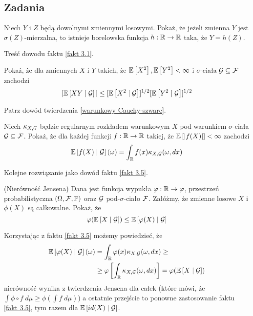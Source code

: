 \subsection{Zadania}

\setcounter{problem}{0}

\begin{problem}
  Niech $Y$ i $Z$ będą dowolnymi zmiennymi losowymi. Pokaż, że jeżeli zmienna $Y$ jest $\sigma(Z)$-mierzalna, to istnieje borelowska funkcja $h:\operatorname{\mathbb{R}}\to \operatorname{\mathbb{R}}$ taka, że $Y=h(Z)$.
\end{problem}

\begin{solution}
  Treść dowodu faktu \ref{fakt 3.1}.
\end{solution}

\begin{problem}
  Pokaż, że dla zmiennych $X$ i $Y$ takich, że $\expected{X^2},\expected{Y^2}<\infty$ i $\sigma$-ciała $\mathcal{G}\subseteq\mathcal{F}$ zachodzi
  $$|\expected{XY}{\set{G}}|\leq[\expected{X^2}{\set{G}}]^{1/2}[\expected{Y^2}{\set{G}}]^{1/2}$$
\end{problem}

\begin{solution}
  Patrz dowód twierdzenia \ref{warunkowy Cauchy-szwarc}.
\end{solution}

\begin{problem}
  Niech $\kappa_{X,\mathcal{G}}$ będzie regularnym rozkładem warunkowym $X$ pod warunkiem $\sigma$-ciała $\mathcal{G}\subseteq\mathcal{F}$. Pokaż, że dla każdej funkcji $f:\operatorname{\mathbb{R}}\to\operatorname{\mathbb{R}}$ takiej, że $\expected{|f(X)|}<\infty$ zachodzi
  $$\expected{f(X)}{\set{G}}(\omega)=\int_{\R}f(x)\kappa_{X,\set{G}}(\omega,dx)$$
\end{problem}

\begin{solution}
  Kolejne rozwiązanie jako dowód faktu \ref{fakt 3.5}.
\end{solution}

\begin{problem}
  (Nierówność Jensena) Dana jest funkcja wypukła $\varphi:\operatorname{\mathbb{R}}\to\varphi$, przestrzeń probabilistyczna $(\Omega,\set{F},\prob)$ oraz $\mathcal{G}$ pod-$\sigma$-ciało $\mathcal{F}$. Załóżmy, że zmienne losowe $X$ i $\phi(X)$ są całkowalne. Pokaż, że
  $$\phi(\expected{X}{\set{G}})\leq\expected{\phi(X)}{\set{G}}$$
\end{problem}

\begin{solution}
  Korzystając z faktu \ref{fakt 3.5} możemy powiedzieć, że
  \begin{align*}
    \expected{\phi(X)}{\set{G}}(\omega)&=\int_{\R}\phi(x)\kappa_{X,\set{G}}(\omega, dx)\geq\\ 
                                       &\geq\phi\left[\int_{\R}\kappa_{X,\set{G}}(\omega, dx) \right]=\phi(\expected{X}{\set{G}})
  \end{align*}
  nierówność wynika z twierdzenia Jensena dla całek (które mówi, że $\int \phi\circ f\;d\mu\geq\phi\left(\int f\;d\mu\right)$) a ostatnie przejście to ponowne zastosowanie faktu \ref{fakt 3.5}, tym razem dla $\expected{id(X)}{\set{G}}$.
\end{solution}

